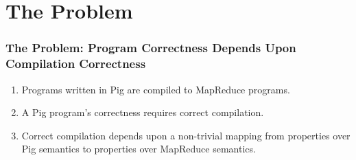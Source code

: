 \section{The Problem}

\begin{frame}
  \frametitle{The Problem: Program Correctness Depends Upon Compilation
    Correctness}
  \begin{enumerate}
    \item Programs written in Pig are compiled to MapReduce programs.
    \item A Pig program's correctness requires correct compilation.
    \item Correct compilation depends upon a non-trivial mapping from
      properties over Pig semantics to properties over MapReduce semantics.
  \end{enumerate}
\end{frame}
